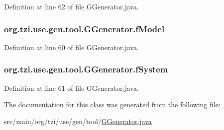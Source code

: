 Definition at line 62 of file G\-Generator.\-java.

\hypertarget{classorg_1_1tzi_1_1use_1_1gen_1_1tool_1_1_g_generator_ab5d7f671096587723fab0689bd060333}{
\subsubsection[{f\-Model}]{ org.\-tzi.\-use.\-gen.\-tool.\-G\-Generator.\-f\-Model\hspace{0.3cm}{\ttfamily [protected]}}}\label{classorg_1_1tzi_1_1use_1_1gen_1_1tool_1_1_g_generator_ab5d7f671096587723fab0689bd060333}


Definition at line 60 of file G\-Generator.\-java.

\hypertarget{classorg_1_1tzi_1_1use_1_1gen_1_1tool_1_1_g_generator_a23eb4998d2d6341e7f05bb57f5e889ad}{
\subsubsection[{f\-System}]{ org.\-tzi.\-use.\-gen.\-tool.\-G\-Generator.\-f\-System\hspace{0.3cm}{\ttfamily [protected]}}}\label{classorg_1_1tzi_1_1use_1_1gen_1_1tool_1_1_g_generator_a23eb4998d2d6341e7f05bb57f5e889ad}


Definition at line 61 of file G\-Generator.\-java.



The documentation for this class was generated from the following file\-:\begin{DoxyCompactItemize}
\item 
src/main/org/tzi/use/gen/tool/\hyperlink{_g_generator_8java}{G\-Generator.\-java}\end{DoxyCompactItemize}
